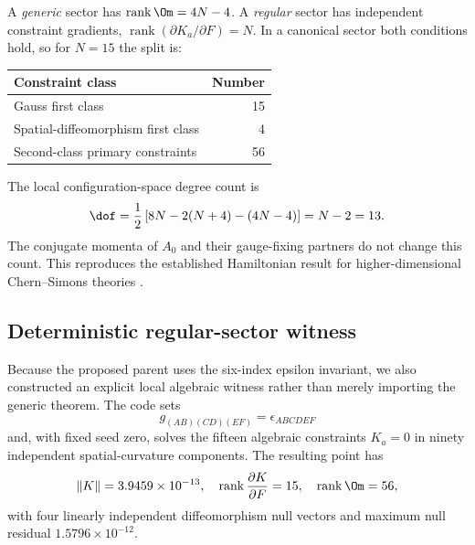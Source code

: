 A \emph{generic} sector has $\operatorname{rank}\Om=4N-4$.  A \emph{regular} sector has independent constraint gradients, $\operatorname{rank}(\partial K_a/\partial F)=N$.  In a canonical sector both conditions hold, so for $N=15$ the split is:
\begin{center}
\begin{tabular}{@{}lr@{}}
\toprule
Constraint class & Number \\
\midrule
Gauss first class & 15 \\
Spatial-diffeomorphism first class & 4 \\
Second-class primary constraints & 56 \\
\bottomrule
\end{tabular}
\end{center}
The local configuration-space degree count is
\[
\dof
=\frac12\left[8N-2(N+4)-(4N-4)\right]
=N-2=13.
\]
The conjugate momenta of $A_0$ and their gauge-fixing partners do not change this count.  This reproduces the established Hamiltonian result for higher-dimensional Chern--Simons theories \citep{BanadosGarayHenneaux1995,BanadosGarayHenneaux1996}.

\subsection{Deterministic regular-sector witness}

Because the proposed parent uses the six-index epsilon invariant, we also constructed an explicit local algebraic witness rather than merely importing the generic theorem.  The code sets
\[
g_{(AB)(CD)(EF)}=\epsilon_{ABCDEF}
\]
and, with fixed seed zero, solves the fifteen algebraic constraints $K_a=0$ in ninety independent spatial-curvature components.  The resulting point has
\[
\|K\|=3.9459\times10^{-13},
\quad
\operatorname{rank}\frac{\partial K}{\partial F}=15,
\quad
\operatorname{rank}\Om=56,
\]
with four linearly independent diffeomorphism null vectors and maximum null residual $1.5796\times10^{-12}$.
